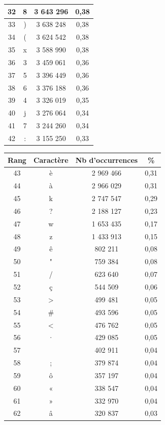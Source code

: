 \documentclass[a4paper,12pt,titlepage]{report}
\begin{document}
\begin{table}[h!]
\begin{tabular}{|c|c|c|c|}
\hline
32 & 8 &  3 643 296 & 0,38 \\
\hline
33 & ) &  3 638 248 & 0,38 \\
\hline
34 & ( &  3 624 542 & 0,38 \\
\hline
35 & x &  3 588 990 & 0,38 \\
\hline
36 & 3 &  3 459 061 & 0,36 \\
\hline
37 & 5 &  3 396 449 & 0,36 \\
\hline
38 & 6 &  3 376 188 & 0,36 \\
\hline
39 & 4 &  3 326 019 & 0,35 \\ 
\hline
40 & j &  3 276 064 & 0,34 \\
\hline
41 & 7 &  3 244 260 & 0,34 \\
\hline
42 & : &  3 155 250 & 0,33 \\
\hline
\end{tabular}
\begin{tabular}{|c|c|c|c|}
\hline
\textbf{Rang} & \textbf{Caractère} & \textbf{Nb d'occurrences} & \textbf{\%} \\
\hline
43 & è &  2 969 466 & 0,31 \\
\hline
44 & à &  2 966 029 & 0,31 \\
\hline
45 & k &  2 747 547 & 0,29 \\
\hline
46 & ? &  2 188 127 & 0,23 \\
\hline
47 & w &  1 653 435 & 0,17 \\
\hline
48 & z &  1 433 913 & 0,15 \\
\hline
49 & ê &	802 211 & 0,08 \\
\hline
50 & " &	759 384 & 0,08 \\
\hline
51 & / &	623 640 & 0,07 \\
\hline
52 & ç &	544 509 & 0,06 \\
\hline
53 & > &	499 481 & 0,05 \\
\hline
54 &\# &	493 596 & 0,05 \\
\hline
55 & < & 	476 762 & 0,05 \\
\hline
56 & · &	429 085 & 0,05 \\
\hline
57 &   &	402 911 & 0,04 \\
\hline
58 & ; &	379 874 & 0,04 \\
\hline
59 & ô &	357 197 & 0,04 \\
\hline
60 & « & 	338 547 & 0,04 \\
\hline
61 & » &	332 970 & 0,04 \\
\hline
62 & â &	320 837 & 0,03 \\

\end{tabular}
\end{table}
\end{document}

